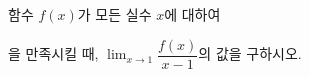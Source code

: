 함수 $f(x)$가 모든 실수 $x$에 대하여 \par\smallskip{}\par\smallskip\noindent 을 만족시킬 때, $\displaystyle\lim_{x\to 1}\dfrac{f(x)}{x-1}$의 값을 구하시오.
